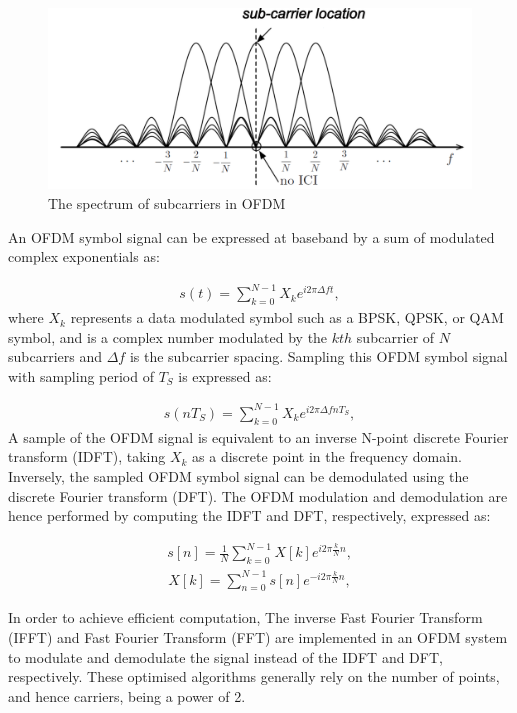 \begin{figure}
	\centerline{\includegraphics [width=0.8\columnwidth] {Figures/OFDM-subcarrier.pdf} }
	\caption{The spectrum of subcarriers in OFDM \cite{farhang2008signal}}
	\label{fig:OFDM-subcarrier}
\end{figure}

An OFDM symbol signal can be expressed at baseband by a sum of modulated complex exponentials as:

\begin{eqnarray}
\label{equ:OFDMsignal}
s(t) = \sum_{k=0}^{N-1} X_k e^{i2\pi\Delta ft},
\end{eqnarray}
where $X_{k}$ represents a data modulated symbol such as a BPSK, QPSK, or QAM symbol, and is a complex number modulated by the $kth$ subcarrier of $N$ subcarriers and $\Delta f$ is the subcarrier spacing. 
Sampling this OFDM symbol signal with sampling period of $T_S$ is expressed as:

\begin{eqnarray}
\label{equ:sampledOFDMsignal}
s(nT_S) = \sum_{k=0}^{N-1} X_k e^{i2\pi\Delta fnT_S},
\end{eqnarray}
A sample of the OFDM signal is equivalent to an inverse N-point discrete Fourier transform (IDFT), taking $X_{k}$ as a discrete point in the frequency domain. 
Inversely, the sampled OFDM symbol signal can be demodulated using the discrete Fourier transform (DFT). The OFDM modulation and demodulation are hence performed by computing the IDFT and DFT, respectively, expressed as:

\begin{eqnarray}
\label{equ:sampledOFDMsignal}
s[n] = \frac{1}{N}\sum_{k=0}^{N-1} X[k] e^{i2\pi\frac{k}{N}n},
\end{eqnarray} 
\begin{eqnarray}
\label{equ:sampledOFDMsignal}
X[k] = \sum_{n=0}^{N-1} s[n] e^{-i2\pi\frac{k}{N}n},
\end{eqnarray} 

In order to achieve efficient computation, The inverse Fast Fourier Transform (IFFT) and Fast Fourier Transform (FFT) are implemented in an OFDM system to modulate and demodulate the signal instead of the IDFT and DFT, respectively. These optimised algorithms generally rely on the number of points, and hence carriers, being a power of 2.

